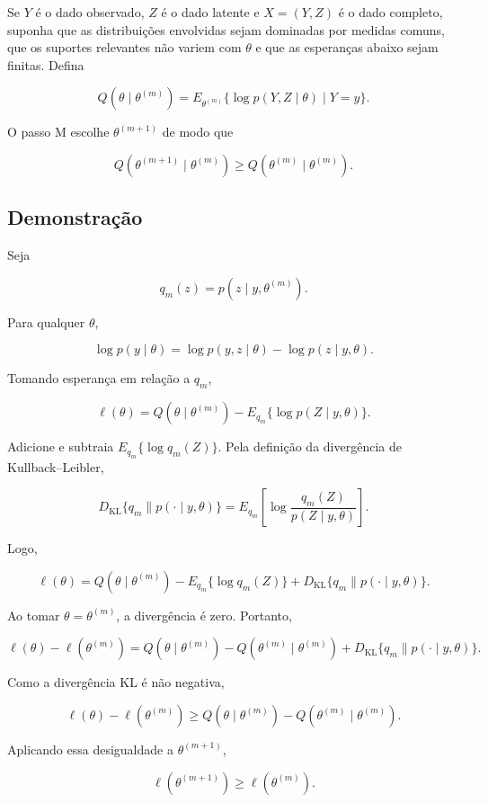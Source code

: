 \documentclass[
  letterpaper,
  DIV=11,
  numbers=noendperiod]{scrreprt}
\begin{document}
Se \(Y\) é o dado observado, \(Z\) é o dado latente e \(X=(Y,Z)\) é o
dado completo, suponha que as distribuições envolvidas sejam dominadas
por medidas comuns, que os suportes relevantes não variem com \(\theta\)
e que as esperanças abaixo sejam finitas. Defina

\[
Q(\theta\mid\theta^{(m)})
=
E_{\theta^{(m)}}
\{\log p(Y,Z\mid\theta)\mid Y=y\}.
\]

O passo M escolhe \(\theta^{(m+1)}\) de modo que

\[
Q(\theta^{(m+1)}\mid\theta^{(m)})
\geq
Q(\theta^{(m)}\mid\theta^{(m)}).
\]

\subsection*{Demonstração}\label{demonstrauxe7uxe3o-21}

Seja

\[
q_m(z)=p(z\mid y,\theta^{(m)}).
\]

Para qualquer \(\theta\),

\[
\log p(y\mid\theta)
=
\log p(y,z\mid\theta)-
\log p(z\mid y,\theta).
\]

Tomando esperança em relação a \(q_m\),

\[
\ell(\theta)
=
Q(\theta\mid\theta^{(m)})
-
E_{q_m}\{\log p(Z\mid y,\theta)\}.
\]

Adicione e subtraia \(E_{q_m}\{\log q_m(Z)\}\). Pela definição da
divergência de Kullback--Leibler,

\[
D_{\mathrm{KL}}
\{q_m\|p(\cdot\mid y,\theta)\}
=
E_{q_m}
\left[
\log\frac{q_m(Z)}{p(Z\mid y,\theta)}
\right].
\]

Logo,

\[
\ell(\theta)
=
Q(\theta\mid\theta^{(m)})
-E_{q_m}\{\log q_m(Z)\}
+
D_{\mathrm{KL}}
\{q_m\|p(\cdot\mid y,\theta)\}.
\]

Ao tomar \(\theta=\theta^{(m)}\), a divergência é zero. Portanto,

\[
\ell(\theta)-\ell(\theta^{(m)})
=
Q(\theta\mid\theta^{(m)})
-Q(\theta^{(m)}\mid\theta^{(m)})
+
D_{\mathrm{KL}}
\{q_m\|p(\cdot\mid y,\theta)\}.
\]

Como a divergência KL é não negativa,

\[
\ell(\theta)-\ell(\theta^{(m)})
\geq
Q(\theta\mid\theta^{(m)})
-Q(\theta^{(m)}\mid\theta^{(m)}).
\]

Aplicando essa desigualdade a \(\theta^{(m+1)}\),

\[
\ell(\theta^{(m+1)})
\geq
\ell(\theta^{(m)}).
\]
\end{document}
